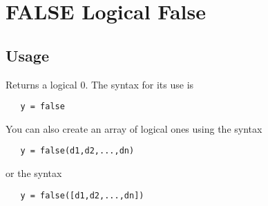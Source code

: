 \section{FALSE Logical False}

\subsection{Usage}

Returns a logical 0.  The syntax for its use is
\begin{verbatim}
   y = false
\end{verbatim}
You can also create an array of logical ones using
the syntax
\begin{verbatim}
   y = false(d1,d2,...,dn)
\end{verbatim}
or the syntax
\begin{verbatim}
   y = false([d1,d2,...,dn])
\end{verbatim}

